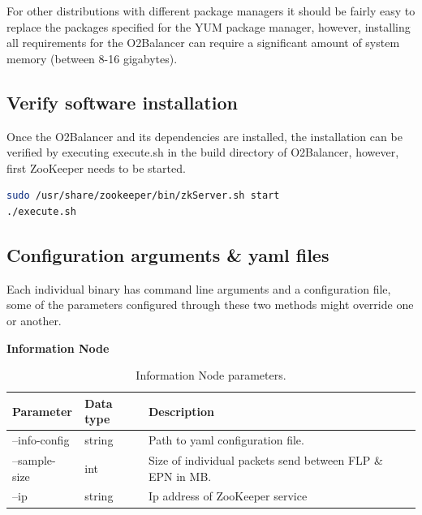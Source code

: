 \documentclass[]{article}
\begin{document}
For other distributions with different package managers it should be fairly easy to replace the packages specified for the YUM package manager, however, installing all requirements for the O2Balancer can require a significant amount of system memory (between 8-16 gigabytes).

\subsection*{Verify software installation}
Once the O2Balancer and its dependencies are installed, the installation can be verified by executing execute.sh in the build directory of O2Balancer, however, first ZooKeeper needs to be started.

\begin{lstlisting}[language=bash]
sudo /usr/share/zookeeper/bin/zkServer.sh start
./execute.sh
\end{lstlisting}

\subsection*{Configuration arguments \& yaml files}
Each individual binary has command line arguments and a configuration file, some of the parameters configured through these two methods might override one or another.

\begin{table}[H]
	\textbf{Information Node}	
	\begin{center}	
		\begin{tabularx}{\textwidth}{ | l | l | X | }
			\hline
			\textbf{Parameter} & \textbf{Data type} & \textbf{Description} \\ \hline
					
			--info-config & string & Path to yaml configuration file. \\ \hline
			--sample-size & int & Size of individual packets send between FLP \& EPN in MB. \\ \hline
			--ip & string & Ip address of ZooKeeper service \\ \hline
		\end{tabularx}
		\caption{Information Node parameters.}
		\label{tab:informationnode}
	\end{center}
\end{table}
\end{document}
